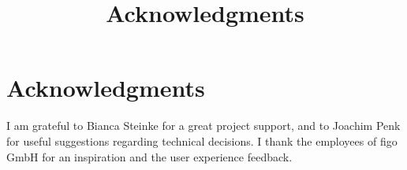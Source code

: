 \title{Acknowledgments}
\chapter*{Acknowledgments}
I am grateful to Bianca Steinke for a great project support, and to Joachim Penk for useful suggestions regarding technical decisions.
I thank the employees of figo GmbH for an inspiration and the user experience feedback.